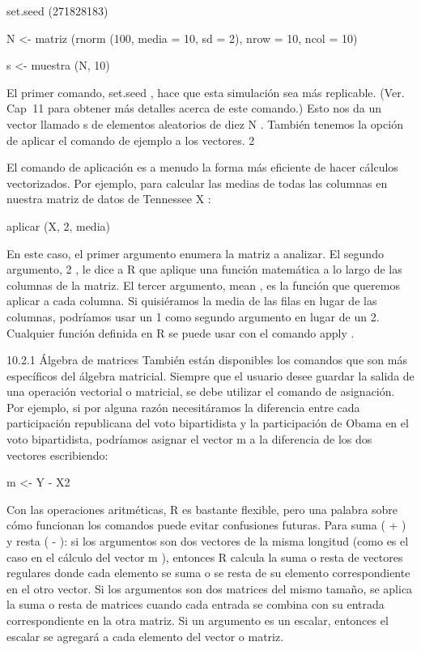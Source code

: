 \documentclass[
]{book}
\begin{document}
set.seed (271828183)

N \textless- matriz (rnorm (100, media = 10, sd = 2), nrow = 10, ncol = 10)

s \textless- muestra (N, 10)

El primer comando, set.seed , hace que esta simulación sea más replicable. (Ver. Cap  11 para obtener más detalles acerca de este comando.) Esto nos da un vector llamado s de elementos aleatorios de diez N . También tenemos la opción de aplicar el comando de ejemplo a los vectores. 2

El comando de aplicación es a menudo la forma más eficiente de hacer cálculos vectorizados. Por ejemplo, para calcular las medias de todas las columnas en nuestra matriz de datos de Tennessee X :

aplicar (X, 2, media)

En este caso, el primer argumento enumera la matriz a analizar. El segundo argumento, 2 , le dice a R que aplique una función matemática a lo largo de las columnas de la matriz. El tercer argumento, mean , es la función que queremos aplicar a cada columna. Si quisiéramos la media de las filas en lugar de las columnas, podríamos usar un 1 como segundo argumento en lugar de un 2. Cualquier función definida en R se puede usar con el comando apply .

10.2.1 Álgebra de matrices
También están disponibles los comandos que son más específicos del álgebra matricial. Siempre que el usuario desee guardar la salida de una operación vectorial o matricial, se debe utilizar el comando de asignación. Por ejemplo, si por alguna razón necesitáramos la diferencia entre cada participación republicana del voto bipartidista y la participación de Obama en el voto bipartidista, podríamos asignar el vector m a la diferencia de los dos vectores escribiendo:

m \textless- Y - X2

Con las operaciones aritméticas, R es bastante flexible, pero una palabra sobre cómo funcionan los comandos puede evitar confusiones futuras. Para suma ( + ) y resta ( - ): si los argumentos son dos vectores de la misma longitud (como es el caso en el cálculo del vector m ), entonces R calcula la suma o resta de vectores regulares donde cada elemento se suma o se resta de su elemento correspondiente en el otro vector. Si los argumentos son dos matrices del mismo tamaño, se aplica la suma o resta de matrices cuando cada entrada se combina con su entrada correspondiente en la otra matriz. Si un argumento es un escalar, entonces el escalar se agregará a cada elemento del vector o matriz.
\end{document}
